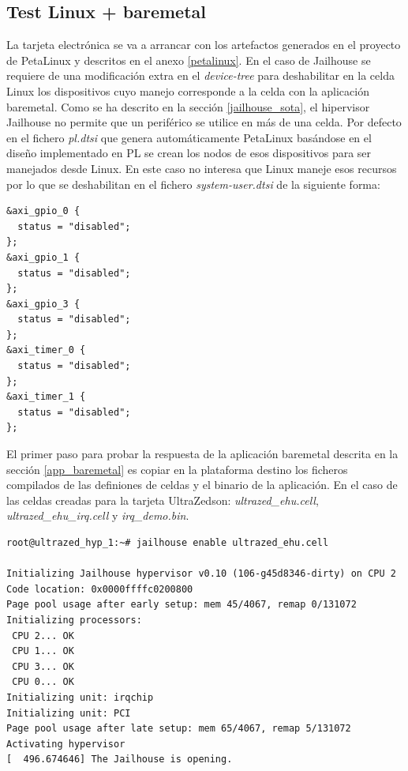 \subsection{Test Linux + baremetal}

La tarjeta electrónica se va a arrancar con los artefactos generados en el proyecto de PetaLinux y descritos en el anexo \ref{petalinux}. En el caso de Jailhouse se requiere de una modificación extra en el \textit{device-tree} para deshabilitar en la celda Linux los dispositivos cuyo manejo corresponde a la celda con la aplicación baremetal. Como se ha descrito en la sección \ref{jailhouse_sota}, el hipervisor Jailhouse no permite que un periférico se utilice en más de una celda. Por defecto en el fichero \textit{pl.dtsi} que genera automáticamente PetaLinux basándose en el diseño implementado en \acrshort{PL} se crean los nodos de esos dispositivos para ser manejados desde Linux. En este caso no interesa que Linux maneje esos recursos por lo que se deshabilitan en el fichero \textit{system-user.dtsi} de la siguiente forma:
\begin{lstlisting}[style=CStyle]
&axi_gpio_0 {
  status = "disabled";
};
&axi_gpio_1 {
  status = "disabled";
};
&axi_gpio_3 {
  status = "disabled";
};
&axi_timer_0 {
  status = "disabled";
};
&axi_timer_1 {
  status = "disabled";
};
\end{lstlisting}

El primer paso para probar la respuesta de la aplicación baremetal descrita en la sección \ref{app_baremetal} es copiar en la plataforma destino los ficheros compilados de las definiones de celdas y el binario de la aplicación. En el caso de las celdas creadas para la tarjeta UltraZed\texttrademark son: \textit{ultrazed\_ehu.cell}, \textit{ultrazed\_ehu\_irq.cell} y \textit{irq\_demo.bin}.

\begin{lstlisting}[style=CStyle]
root@ultrazed_hyp_1:~# jailhouse enable ultrazed_ehu.cell

Initializing Jailhouse hypervisor v0.10 (106-g45d8346-dirty) on CPU 2
Code location: 0x0000ffffc0200800
Page pool usage after early setup: mem 45/4067, remap 0/131072
Initializing processors:
 CPU 2... OK
 CPU 1... OK
 CPU 3... OK
 CPU 0... OK
Initializing unit: irqchip
Initializing unit: PCI
Page pool usage after late setup: mem 65/4067, remap 5/131072
Activating hypervisor
[  496.674646] The Jailhouse is opening.
\end{lstlisting}

